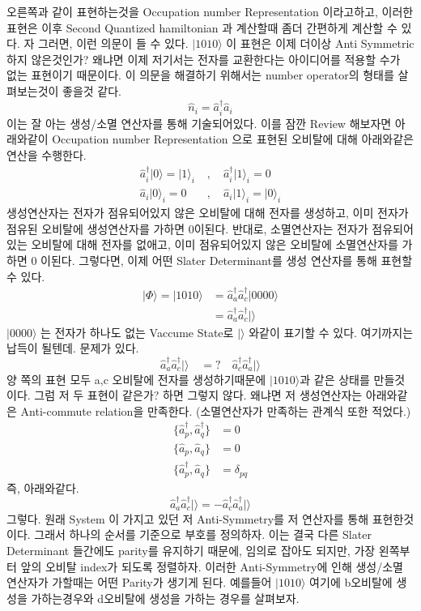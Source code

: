 \documentclass[10pt]{article}
\begin{document}
오른쪽과 같이 표현하는것을 Occupation number Representation 이라고하고, 이러한 표현은 이후 Second Quantized hamiltonian 과 계산할때 좀더 간편하게 계산할 수 있다. 
자 그러면, 이런 의문이 들 수 있다. \(\vert 1010 \rangle \) 이 표현은 이제 더이상 Anti Symmetric 하지 않은것인가? 왜냐면 이제 저기서는 전자를 교환한다는 아이디어를 적용할 수가 없는 표현이기 때문이다. 
이 의문을 해결하기 위해서는 number operator의 형태를 살펴보는것이 좋을것 같다. 
\[
\hat{n}_i = \hat{a}_i^{\dagger}\hat{a}_i
\]
이는 잘 아는 생성/소멸 연산자를 통해 기술되어있다. 이를 잠깐 Review 해보자면 아래와같이 Occupation number Representation 으로 표현된 오비탈에 대해 아래와같은 연산을 수행한다. 
\begin{align*}
\hat{a}_i^{\dagger} \vert 0 \rangle = \vert 1 \rangle_i &,\quad \hat{a}_i^{\dagger} \vert 1 \rangle_i = 0 \\
\hat{a}_i \vert 0 \rangle_i = 0 \quad &,\quad \hat{a}_i \vert 1 \rangle_i = \vert 0 \rangle_i
\end{align*}
생성연산자는 전자가 점유되어있지 않은 오비탈에 대해 전자를 생성하고, 이미 전자가 점유된 오비탈에 생성연산자를 가하면 0이된다. 
반대로, 소멸연산자는 전자가 점유되어있는 오비탈에 대해 전자를 없애고, 이미 점유되어있지 않은 오비탈에 소멸연산자를 가하면 0 이된다. 
그렇다면, 이제 어떤 Slater Determinant를 생성 연산자를 통해 표현할 수 있다. 
\begin{align*}
| \Phi \rangle = \vert 1010 \rangle &= \hat{a}_a^{\dagger}\hat{a}_c^{\dagger} \vert 0000 \rangle \\
&= \hat{a}_a^{\dagger}\hat{a}_c^{\dagger} \vert \rangle 
\end{align*}
\(\vert 0000 \rangle\) 는 전자가 하나도 없는 Vaccume State로 \(\vert \rangle\) 와같이 표기할 수 있다. 여기까지는 납득이 될텐데. 문제가 있다. 
\[
\hat{a}_a^{\dagger}\hat{a}_c^{\dagger} \vert \rangle \quad =? \quad \hat{a}_c^{\dagger}\hat{a}_a^{\dagger} \vert \rangle
\]
양 쪽의 표현 모두 a,c 오비탈에 전자를 생성하기때문에 \(\vert 1010 \rangle \)과 같은 상태를 만들것이다. 그럼 저 두 표현이 같은가? 하면 그렇지 않다. 
왜냐면 저 생성연산자는 아래와같은 Anti-commute relation을 만족한다. (소멸연산자가 만족하는 관계식 또한 적었다.)
\begin{align*}
\{ \hat{a}_p^\dagger, \hat{a}_q^\dagger \} &= 0 \\
\{ \hat{a}_p, \hat{a}_q \} &= 0 \\
\{ \hat{a}_p^\dagger, \hat{a}_q \} &= \delta_{pq}
\end{align*}
즉, 아래와같다. 
\[
\hat{a}_a^{\dagger}\hat{a}_c^{\dagger} \vert \rangle  = - \hat{a}_c^{\dagger}\hat{a}_a^{\dagger} \vert \rangle
\]
그렇다. 원래 System 이 가지고 있던 저 Anti-Symmetry를 저 연산자를 통해 표현한것이다. 그래서 하나의 순서를 기준으로 부호를 정의하자. 이는 결국 다른 Slater Determinant 들간에도 parity를 유지하기 때문에, 임의로 잡아도 되지만, 
가장 왼쪽부터 앞의 오비탈 index가 되도록 정렬하자. 이러한 Anti-Symmetry에 인해 생성/소멸 연산자가 가할때는 어떤 Parity가 생기게 된다. 
예를들어 \(\vert 1010 \rangle \) 여기에 b오비탈에 생성을 가하는경우와 d오비탈에 생성을 가하는 경우를 살펴보자. 
\end{document}
